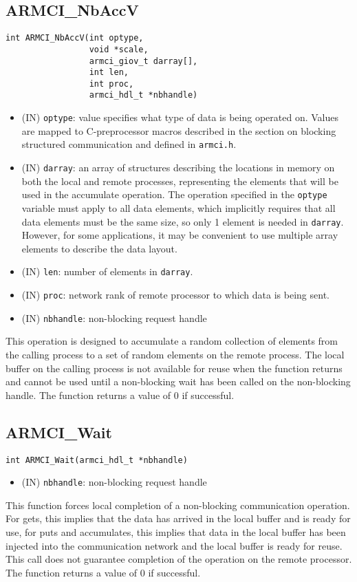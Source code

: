 \documentclass[12pt]{article}
\begin{document}
\subsection{ARMCI\_NbAccV}
\begin{verbatim}
int ARMCI_NbAccV(int optype,
                 void *scale,
                 armci_giov_t darray[],
                 int len,
                 int proc,
                 armci_hdl_t *nbhandle)
\end{verbatim}
\begin{itemize}
\item (IN) \texttt{optype}: value specifies what type of data is being operated
on. Values are mapped to C-preprocessor macros described in the section on
blocking structured communication and defined in \texttt{armci.h}.
\item (IN) \texttt{darray}: an array of structures describing the
locations in memory on both the local and remote processes, representing the
elements that will be used in the accumulate operation. The operation specified
in the \texttt{optype} variable must apply to all data elements, which
implicitly requires that all data elements must be the same size, so only 1
element is needed in \texttt{darray}. However, for some applications, it may be
convenient to use multiple array elements to describe the data layout.
\item (IN) \texttt{len}: number of elements in \texttt{darray}.
\item (IN) \texttt{proc}: network rank of remote processor to which data is
being sent.
\item (IN) \texttt{nbhandle}: non-blocking request handle
\end{itemize}

This operation is designed to accumulate a random collection of elements from the
calling process to a set of random elements on the remote process.
The local buffer on the calling process is not available for reuse
when the function returns and cannot be used until a non-blocking wait has been
called on the non-blocking handle. The function returns a value of 0
if successful.

\subsection{ARMCI\_Wait}
\begin{verbatim}
int ARMCI_Wait(armci_hdl_t *nbhandle)
\end{verbatim}
\begin{itemize}
\item (IN) \texttt{nbhandle}: non-blocking request handle
\end{itemize}
This function forces local completion of a non-blocking communication operation.
For gets, this implies that the data has arrived in the local buffer and is
ready for use, for puts and accumulates, this implies that data in the local
buffer has been injected into the communication network and the local buffer is
ready for reuse. This call does not guarantee completion of the operation on the
remote processor. The function returns a value of 0 if successful.
\end{document}
